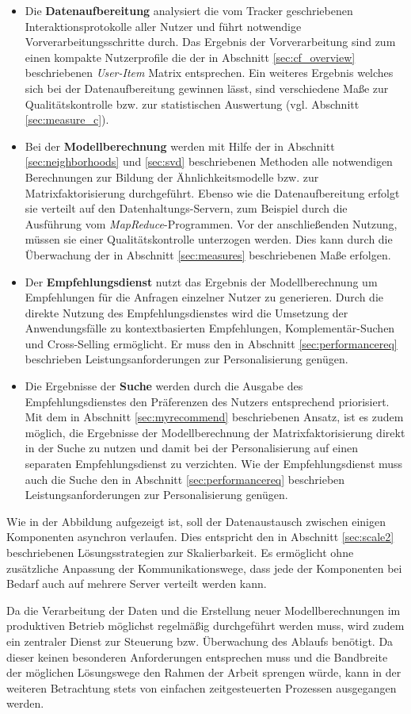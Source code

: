 \begin{itemize}
\item Die \textbf{Datenaufbereitung} analysiert die vom Tracker geschriebenen Interaktionsprotokolle aller Nutzer und führt notwendige Vorverarbeitungsschritte durch. Das Ergebnis der Vorverarbeitung sind zum einen kompakte Nutzerprofile die der in Abschnitt \ref{sec:cf_overview} beschriebenen \textit{User-Item} Matrix entsprechen. Ein weiteres Ergebnis welches sich bei der Datenaufbereitung gewinnen lässt, sind verschiedene Maße zur Qualitätskontrolle bzw. zur statistischen Auswertung (vgl. Abschnitt \ref{sec:measure_c}).
\item Bei der \textbf{Modellberechnung} werden mit Hilfe der in Abschnitt \ref{sec:neighborhoods} und \ref{sec:svd} beschriebenen Methoden alle notwendigen Berechnungen zur Bildung der Ähnlichkeitsmodelle bzw. zur Matrixfaktorisierung durchgeführt. Ebenso wie die Datenaufbereitung erfolgt sie verteilt auf den Datenhaltungs-Servern, zum Beispiel durch die Ausführung vom \textit{MapReduce}-Programmen. Vor der anschließenden Nutzung, müssen sie einer Qualitätskontrolle unterzogen werden. Dies kann durch die Überwachung der in Abschnitt \ref{sec:measures} beschriebenen Maße erfolgen.
\item Der \textbf{Empfehlungsdienst} nutzt das Ergebnis der Modellberechnung um Empfehlungen für die Anfragen einzelner Nutzer zu generieren. Durch die direkte Nutzung des Empfehlungsdienstes wird die Umsetzung der Anwendungsfälle zu kontextbasierten Empfehlungen, Komplementär-Suchen und Cross-Selling ermöglicht.  Er muss den in Abschnitt \ref{sec:performancereq} beschrieben Leistungsanforderungen zur Personalisierung genügen.
\item Die Ergebnisse der \textbf{Suche} werden durch die Ausgabe des Empfehlungsdienstes den Präferenzen des Nutzers entsprechend priorisiert. Mit dem in Abschnitt \ref{sec:myrecommend} beschriebenen Ansatz, ist es zudem möglich, die Ergebnisse der Modellberechnung der Matrixfaktorisierung direkt in der Suche zu nutzen und damit bei der Personalisierung auf einen separaten Empfehlungsdienst zu verzichten. Wie der Empfehlungsdienst muss auch die Suche den in Abschnitt \ref{sec:performancereq} beschrieben Leistungsanforderungen zur Personalisierung genügen.
\end{itemize}

Wie in der Abbildung aufgezeigt ist, soll der Datenaustausch zwischen einigen Komponenten asynchron verlaufen. Dies entspricht den in Abschnitt \ref{sec:scale2} beschriebenen Lösungsstrategien zur Skalierbarkeit. Es ermöglicht ohne zusätzliche Anpassung der Kommunikationswege, dass jede der Komponenten bei Bedarf auch auf mehrere Server verteilt werden kann.

Da die Verarbeitung der Daten und die Erstellung neuer Modellberechnungen im produktiven Betrieb möglichst regelmäßig durchgeführt werden muss, wird zudem ein zentraler Dienst zur Steuerung bzw. Überwachung des Ablaufs benötigt. Da dieser keinen besonderen Anforderungen entsprechen muss und die Bandbreite der möglichen Lösungswege den Rahmen der Arbeit sprengen würde, kann in der weiteren Betrachtung stets von einfachen zeitgesteuerten Prozessen ausgegangen werden. 

